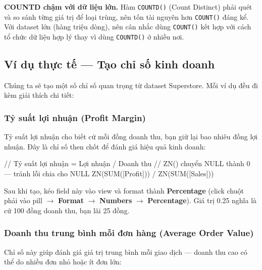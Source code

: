 \documentclass[12pt]{article}
\begin{document}
\begin{notebox}
\textbf{COUNTD chậm với dữ liệu lớn.} Hàm \texttt{COUNTD()} (Count Distinct) phải quét và so sánh từng giá trị để loại trùng, nên tốn tài nguyên hơn \texttt{COUNT()} đáng kể. Với dataset lớn (hàng triệu dòng), nên cân nhắc dùng \texttt{COUNT()} kết hợp với cách tổ chức dữ liệu hợp lý thay vì dùng \texttt{COUNTD()} ở nhiều nơi.
\end{notebox}

\subsection{Ví dụ thực tế --- Tạo chỉ số kinh doanh}

\noindent Chúng ta sẽ tạo một số chỉ số quan trọng từ dataset Superstore. Mỗi ví dụ đều đi kèm giải thích chi tiết:

\subsubsection{Tỷ suất lợi nhuận (Profit Margin)}

\noindent Tỷ suất lợi nhuận cho biết cứ mỗi đồng doanh thu, bạn giữ lại bao nhiêu đồng lợi nhuận. Đây là chỉ số then chốt để đánh giá hiệu quả kinh doanh:

\begin{aivncodebox}[]
\begin{python}
// Tỷ suất lợi nhuận = Lợi nhuận / Doanh thu
// ZN() chuyển NULL thành 0 — tránh lỗi chia cho NULL
ZN(SUM([Profit])) / ZN(SUM([Sales]))
\end{python}
\end{aivncodebox}

\noindent Sau khi tạo, kéo field này vào view và format thành \textbf{Percentage} (click chuột phải vào pill $\rightarrow$ \textbf{Format} $\rightarrow$ \textbf{Numbers} $\rightarrow$ \textbf{Percentage}). Giá trị 0.25 nghĩa là cứ 100 đồng doanh thu, bạn lãi 25 đồng.

\subsubsection{Doanh thu trung bình mỗi đơn hàng (Average Order Value)}

\noindent Chỉ số này giúp đánh giá giá trị trung bình mỗi giao dịch --- doanh thu cao có thể do nhiều đơn nhỏ hoặc ít đơn lớn:
\end{document}
